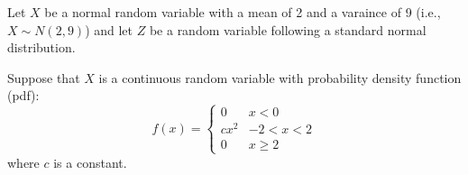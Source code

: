 \documentclass[addpoints]{examsetup}
\begin{document}




\examCoverPage

\begin{questions}
\question

Let $X$ be a normal random variable with a mean of 2 and a varaince of 9 (i.e., $X \sim N(2,9)$) and let $Z$ be a random variable following a standard normal distribution.


\newpage
\question 

Suppose that $X$ is a continuous random variable with probability density function (pdf):
$$
f(x) = 
\begin{cases}
    0 &  x < 0 \\
    c x^2 &  -2  < x < 2 \\
    0 & x \ge 2
\end{cases}
$$
where $c$ is a constant.


\end{questions}
\end{document}
